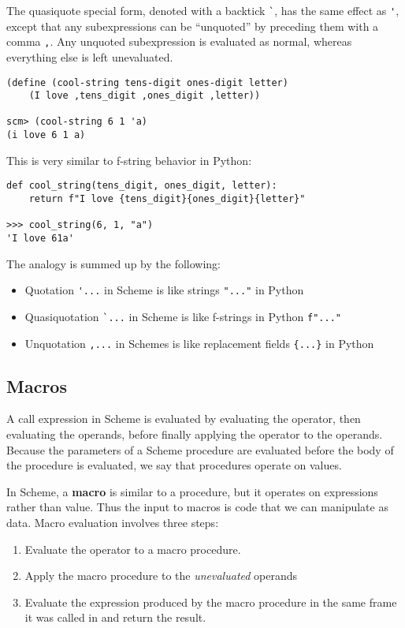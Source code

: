 The quasiquote special form, denoted with a backtick \lstinline{`}, has the same effect as \lstinline{'}, except that any subexpressions can be ``unquoted'' by preceding them with a comma \lstinline{,}. Any unquoted subexpression is evaluated as normal, whereas everything else is left unevaluated. 

\begin{lstlisting}
(define (cool-string tens-digit ones-digit letter)
    (I love ,tens_digit ,ones_digit ,letter))

scm> (cool-string 6 1 'a)
(i love 6 1 a)
\end{lstlisting}

This is very similar to f-string behavior in Python: 

\begin{lstlisting}
def cool_string(tens_digit, ones_digit, letter):
    return f"I love {tens_digit}{ones_digit}{letter}"

>>> cool_string(6, 1, "a")
'I love 61a'
\end{lstlisting}

The analogy is summed up by the following: 
\begin{itemize}
    \item Quotation \lstinline{'...} in Scheme is like strings \lstinline{"..."} in Python
    \item Quasiquotation \lstinline{`...} in Scheme is like f-strings in Python \lstinline{f"..."}
    \item Unquotation \lstinline{,...} in Schemes is like replacement fields \lstinline|{...}| in Python
\end{itemize}

\subsection{Macros}
A call expression in Scheme is evaluated by evaluating the operator, then evaluating the operands, before finally applying the operator to the operands. Because the parameters of a Scheme procedure are evaluated before the body of the procedure is evaluated, we say that procedures operate on values. 

In Scheme, a \textbf{macro} is similar to a procedure, but it operates on expressions rather than value. Thus the input to macros is code that we can manipulate as data. Macro evaluation involves three steps:

\begin{enumerate}[1.]
\item Evaluate the operator to a macro procedure. 
\item Apply the macro procedure to the \textit{unevaluated} operands
\item Evaluate the expression produced by the macro procedure in the same frame it was called in and return the result.
\end{enumerate}

